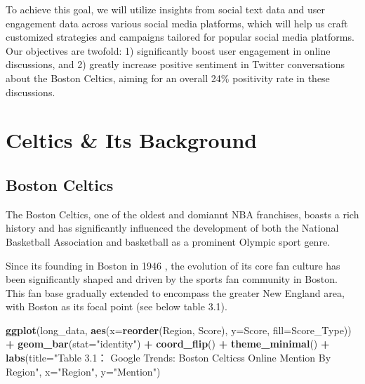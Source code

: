 \documentclass[
]{book}
\newenvironment{Shaded}{\begin{snugshade}}{\end{snugshade}}
\newcommand{\AttributeTok}[1]{\textcolor[rgb]{0.13,0.29,0.53}{#1}}
\newcommand{\FunctionTok}[1]{\textcolor[rgb]{0.13,0.29,0.53}{\textbf{#1}}}
\newcommand{\NormalTok}[1]{#1}
\newcommand{\SpecialCharTok}[1]{\textcolor[rgb]{0.81,0.36,0.00}{\textbf{#1}}}
\newcommand{\StringTok}[1]{\textcolor[rgb]{0.31,0.60,0.02}{#1}}
\begin{document}
To achieve this goal, we will utilize insights from social text data and user engagement data across various social media platforms, which will help us craft customized strategies and campaigns tailored for popular social media platforms. Our objectives are twofold: 1) significantly boost user engagement in online discussions, and 2) greatly increase positive sentiment in Twitter conversations about the Boston Celtics, aiming for an overall 24\% positivity rate in these discussions.

\hypertarget{celtics-its-background}{%
\chapter{Celtics \& Its Background}\label{celtics-its-background}}

\hypertarget{boston-celtics}{%
\section{Boston Celtics}\label{boston-celtics}}

The Boston Celtics, one of the oldest and domiannt NBA franchises, boasts a rich history and has significantly influenced the development of both the National Basketball Association and basketball as a prominent Olympic sport genre.

Since its founding in Boston in 1946 \citep{britannica2023bostonceltics}, the evolution of its core fan culture has been significantly shaped and driven by the sports fan community in Boston. This fan base gradually extended to encompass the greater New England area, with Boston as its focal point (see below table 3.1).

\begin{Shaded}
\begin{Highlighting}[]
\FunctionTok{ggplot}\NormalTok{(long\_data, }\FunctionTok{aes}\NormalTok{(}\AttributeTok{x=}\FunctionTok{reorder}\NormalTok{(Region, Score), }\AttributeTok{y=}\NormalTok{Score, }\AttributeTok{fill=}\NormalTok{Score\_Type)) }\SpecialCharTok{+} 
  \FunctionTok{geom\_bar}\NormalTok{(}\AttributeTok{stat=}\StringTok{"identity"}\NormalTok{) }\SpecialCharTok{+}
  \FunctionTok{coord\_flip}\NormalTok{() }\SpecialCharTok{+}
  \FunctionTok{theme\_minimal}\NormalTok{() }\SpecialCharTok{+}
  \FunctionTok{labs}\NormalTok{(}\AttributeTok{title=}\StringTok{"Table 3.1： Google Trends: Boston Celtics\textquotesingle{}s Online Mention By Region"}\NormalTok{, }\AttributeTok{x=}\StringTok{"Region"}\NormalTok{, }\AttributeTok{y=}\StringTok{"Mention"}\NormalTok{)}
\end{Highlighting}
\end{Shaded}
\end{document}
